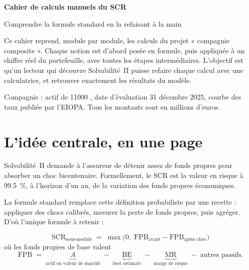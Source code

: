\documentclass[11pt,a4paper]{article}
\newcommand{\Meuro}{\text{M\texteuro}}
\begin{document}
\begin{titlepage}
\centering
\vspace*{3cm}
{\color{bleufonce}\Huge\bfseries Cahier de calculs manuels du SCR\par}
\vspace{0.8cm}
{\LARGE Comprendre la formule standard en la refaisant à la main\par}
\vspace{2cm}
\begin{minipage}{0.82\linewidth}\small
Ce cahier reprend, module par module, les calculs du projet « compagnie composite ». Chaque
notion est d'abord posée en formule, puis appliquée à un chiffre réel du portefeuille, avec
toutes les étapes intermédiaires. L'objectif est qu'un lecteur qui découvre Solvabilité~II
puisse refaire chaque calcul avec une calculatrice, et retrouver exactement les résultats du
modèle.

\vspace{0.4cm}
Compagnie : actif de \num{11000} \Meuro{}, date d'évaluation 31 décembre 2025, courbe des taux
publiée par l'EIOPA. Tous les montants sont en millions d'euros.
\end{minipage}
\vfill
\end{titlepage}

\tableofcontents
\newpage

\section{L'idée centrale, en une page}

Solvabilité~II demande à l'assureur de détenir assez de fonds propres pour absorber un choc
bicentenaire. Formellement, le SCR est la valeur en risque à \qty{99.5}{\percent}, à l'horizon
d'un an, de la variation des fonds propres économiques.

La formule standard remplace cette définition probabiliste par une recette : appliquer des chocs
calibrés, mesurer la perte de fonds propres, puis agréger. D'où l'unique formule à retenir :

\begin{methode}
\[
\boxed{\ \mathrm{SCR}_{\text{sous-module}} \;=\; \max\bigl(0,\; \mathrm{FPB}_{\text{avant}}
- \mathrm{FPB}_{\text{après choc}}\bigr)\ }
\]
où les fonds propres de base valent
\[
\mathrm{FPB} \;=\; \underbrace{A}_{\text{actif en valeur de marché}}
\;-\; \underbrace{\mathrm{BE}}_{\text{best estimate}}
\;-\; \underbrace{\mathrm{MR}}_{\text{marge de risque}}
\;-\; \text{autres passifs}.
\]
\end{methode}
\end{document}
